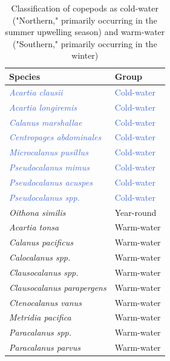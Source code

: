 \documentclass[12pt,twoside]{reedthesis}
\begin{document}
\begin{table}	
	\begin{center} 
		\begin{tabular}{l l}  
			\toprule
			Species &  Group \\ 
			\midrule 
			\textcolor{RoyalBlue}{\textit{Acartia clausii}} & 	\textcolor{RoyalBlue}{Cold-water} 	 \\ 
			\textcolor{RoyalBlue}{\textit{Acartia longiremis}}	& \textcolor{RoyalBlue}{Cold-water}  \\
			\textcolor{RoyalBlue}{\textit{Calanus marshallae}}	& \textcolor{RoyalBlue}{Cold-water}  \\
			\textcolor{RoyalBlue}{\textit{Centropages abdominales}}	& \textcolor{RoyalBlue}{Cold-water}  \\
			\textcolor{RoyalBlue}{\textit{Microcalanus pusillus}}	& \textcolor{RoyalBlue}{Cold-water}  \\
			\textcolor{RoyalBlue}{\textit{Pseudocalanus mimus}} & \textcolor{RoyalBlue}{Cold-water}  \\
			\textcolor{RoyalBlue}{\textit{Pseudocalanus acuspes}} & \textcolor{RoyalBlue}{Cold-water}  \\
			\textcolor{RoyalBlue}{\textit{Pseudocalanus spp.}} & \textcolor{RoyalBlue}{Cold-water}  \\
			\textit{Oithona similis}	& Year-round  \\
			\textcolor{RedOrange}{\textit{Acartia tonsa}}	& \textcolor{RedOrange}{Warm-water}  \\
			\textcolor{RedOrange}{\textit{Calanus pacificus}}	& \textcolor{RedOrange}{Warm-water}  \\
			\textcolor{RedOrange}{\textit{Calocalanus spp.}}	& \textcolor{RedOrange}{Warm-water}  \\
			\textcolor{RedOrange}{\textit{Clausocalanus spp.}} & \textcolor{RedOrange}{Warm-water}  \\
			\textcolor{RedOrange}{\textit{Clausocalanus parapergens}} & \textcolor{RedOrange}{Warm-water}  \\
			\textcolor{RedOrange}{\textit{Ctenocalanus vanus}}  & \textcolor{RedOrange}{Warm-water}  \\
			\textcolor{RedOrange}{\textit{Metridia pacifica}}	& \textcolor{RedOrange}{Warm-water}  \\
			\textcolor{RedOrange}{\textit{Paracalanus spp.}}	& \textcolor{RedOrange}{Warm-water}  \\
			\textcolor{RedOrange}{\textit{Paracalanus parvus}} & \textcolor{RedOrange}{Warm-water}  \\
			\bottomrule 
		\end{tabular}
		\label{CopepodGroups} %
		\caption[Seasonal classification of copepods]{Classification of copepods as cold-water ("Northern," primarily occurring in the summer upwelling season) and warm-water ("Southern," primarily occurring in the winter) \autocite{NOAAFisheries2024, Peterson2003, Peterson1977}}  %
	\end{center}
\end{table}
\end{document}

